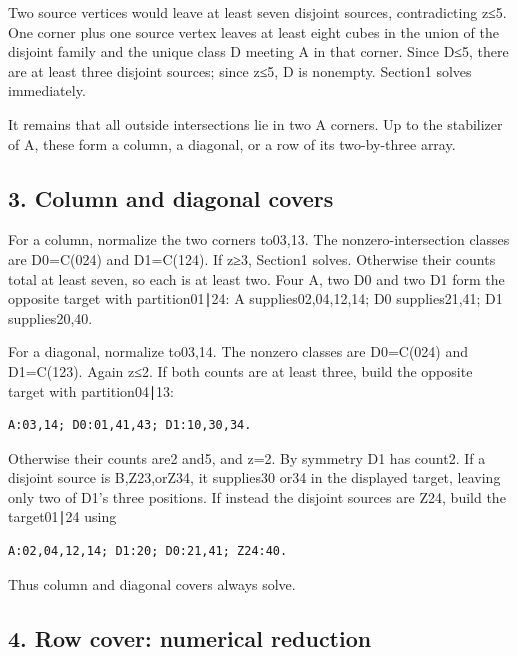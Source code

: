 \documentclass[
  10pt,
]{article}
\begin{document}
Two source vertices would leave at least seven disjoint sources,
contradicting z≤5. One corner plus one source vertex leaves at least
eight cubes in the union of the disjoint family and the unique class D
meeting A in that corner. Since D≤5, there are at least three disjoint
sources; since z≤5, D is nonempty. Section1 solves immediately.

It remains that all outside intersections lie in two A corners. Up to
the stabilizer of A, these form a column, a diagonal, or a row of its
two-by-three array.

\hypertarget{column-and-diagonal-covers}{%
\subsection*{3. Column and diagonal
covers}\label{column-and-diagonal-covers}}

For a column, normalize the two corners to03,13. The
nonzero-intersection classes are D0=C(024) and D1=C(124). If z≥3,
Section1 solves. Otherwise their counts total at least seven, so each is
at least two. Four A, two D0 and two D1 form the opposite target with
partition01∣24: A supplies02,04,12,14; D0 supplies21,41; D1
supplies20,40.

For a diagonal, normalize to03,14. The nonzero classes are D0=C(024) and
D1=C(123). Again z≤2. If both counts are at least three, build the
opposite target with partition04∣13:

\begin{verbatim}
A:03,14; D0:01,41,43; D1:10,30,34.
\end{verbatim}

Otherwise their counts are2 and5, and z=2. By symmetry D1 has count2. If
a disjoint source is B,Z23,orZ34, it supplies30 or34 in the displayed
target, leaving only two of D1's three positions. If instead the
disjoint sources are Z24, build the target01∣24 using

\begin{verbatim}
A:02,04,12,14; D1:20; D0:21,41; Z24:40.
\end{verbatim}

Thus column and diagonal covers always solve.

\hypertarget{row-cover-numerical-reduction}{%
\subsection*{4. Row cover: numerical
reduction}\label{row-cover-numerical-reduction}}
\end{document}
